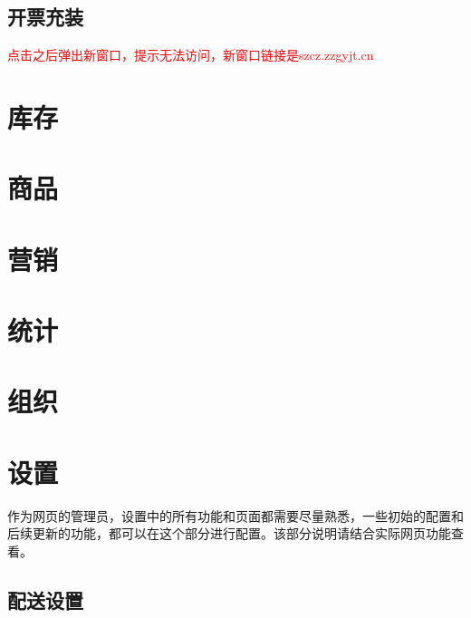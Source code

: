 \documentclass[UTF8]{ctexart}
\begin{document}
\subsection{开票充装}

\textcolor{red}{点击之后弹出新窗口，提示无法访问，新窗口链接是szcz.zzgyjt.cn}

\section{库存}

\section{商品}

\section{营销}

\section{统计}

\section{组织}



\section{设置}
作为网页的管理员，设置中的所有功能和页面都需要尽量熟悉，一些初始的配置和后续更新的功能，都可以在这个部分进行配置。该部分说明请结合实际网页功能查看。

\subsection{配送设置}
\end{document}
